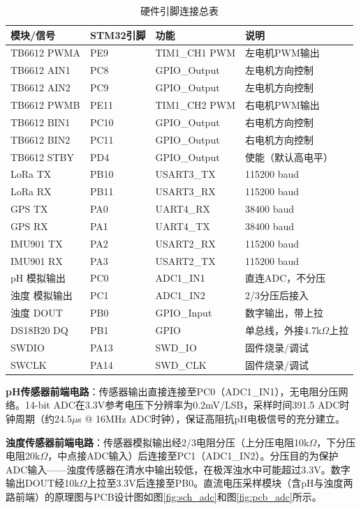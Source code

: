 \documentclass[12pt,a4paper]{ctexart}
\begin{document}
\begin{table}[H]
\centering
\caption{硬件引脚连接总表}
\label{tab:pins}
\begin{tabular}{p{3.5cm}p{2.5cm}p{3cm}p{4.5cm}}
\toprule
\textbf{模块/信号} & \textbf{STM32引脚} & \textbf{功能} & \textbf{说明} \\
\midrule
TB6612 PWMA & PE9 & TIM1\_CH1 PWM & 左电机PWM输出 \\
TB6612 AIN1 & PC8 & GPIO\_Output & 左电机方向控制 \\
TB6612 AIN2 & PC9 & GPIO\_Output & 左电机方向控制 \\
TB6612 PWMB & PE11 & TIM1\_CH2 PWM & 右电机PWM输出 \\
TB6612 BIN1 & PC10 & GPIO\_Output & 右电机方向控制 \\
TB6612 BIN2 & PC11 & GPIO\_Output & 右电机方向控制 \\
TB6612 STBY & PD4 & GPIO\_Output & 使能（默认高电平） \\
\midrule
LoRa TX & PB10 & USART3\_TX & 115200 baud \\
LoRa RX & PB11 & USART3\_RX & 115200 baud \\
\midrule
GPS TX & PA0 & UART4\_RX & 38400 baud \\
GPS RX & PA1 & UART4\_TX & 38400 baud \\
\midrule
IMU901 TX & PA2 & USART2\_RX & 115200 baud \\
IMU901 RX & PA3 & USART2\_TX & 115200 baud \\
\midrule
pH 模拟输出 & PC0 & ADC1\_IN1 & 直连ADC，不分压 \\
浊度 模拟输出 & PC1 & ADC1\_IN2 & 2/3分压后接入 \\
浊度 DOUT & PB0 & GPIO\_Input & 数字输出，带上拉 \\
\midrule
DS18B20 DQ & PB1 & GPIO & 单总线，外接4.7k$\Omega$上拉 \\
\midrule
SWDIO & PA13 & SWD\_IO & 固件烧录/调试 \\
SWCLK & PA14 & SWD\_CLK & 固件烧录/调试 \\
\bottomrule
\end{tabular}
\end{table}

\textbf{pH传感器前端电路}：传感器输出直接连接至PC0（ADC1\_IN1），无电阻分压网络。14-bit ADC在3.3V参考电压下分辨率为0.2mV/LSB，采样时间391.5 ADC时钟周期（约24.5$\mu$s @ 16MHz ADC时钟），保证高阻抗pH电极信号的充分建立。

\textbf{浊度传感器前端电路}：传感器模拟输出经2/3电阻分压（上分压电阻10k$\Omega$，下分压电阻20k$\Omega$，中点接ADC输入）后连接至PC1（ADC1\_IN2）。分压目的为保护ADC输入——浊度传感器在清水中输出较低，在极浑浊水中可能超过3.3V。数字输出DOUT经10k$\Omega$上拉至3.3V后连接至PB0。直流电压采样模块（含pH与浊度两路前端）的原理图与PCB设计图如图\ref{fig:sch_adc}和图\ref{fig:pcb_adc}所示。
\end{document}
